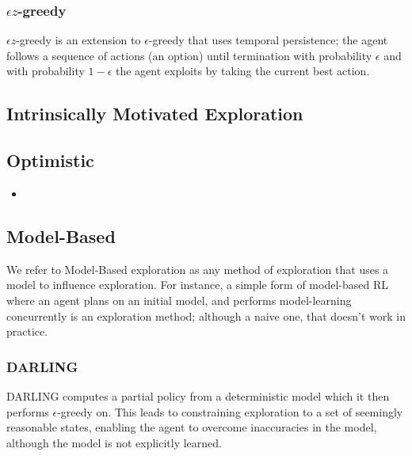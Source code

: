 \subsubsection{$\epsilon z$-greedy}
$\epsilon z$-greedy \cite{dabney2021temporallyextended} is an extension to $\epsilon$-greedy that uses temporal persistence; the agent follows a sequence of actions (an option) until termination with probability $\epsilon$ and with probability $1-\epsilon$ the agent exploits by taking the current best action.
\subsection{Intrinsically Motivated Exploration}
\subsection{Optimistic}
\begin{itemize}
    \item
\end{itemize}
\subsection{Model-Based}
We refer to Model-Based exploration as any method of exploration that uses a model to influence exploration. For instance, a simple form of model-based RL where an agent plans on an initial model, and performs model-learning concurrently is an exploration method; although a naive one, that doesn't work in practice.
\subsubsection{DARLING}
DARLING \cite{AIJ16-leonetti} computes a partial policy from a deterministic model which it then performs $\epsilon$-greedy on. This leads to constraining exploration to a set of seemingly reasonable states, enabling the agent to overcome inaccuracies in the model, although the model is not explicitly learned.

